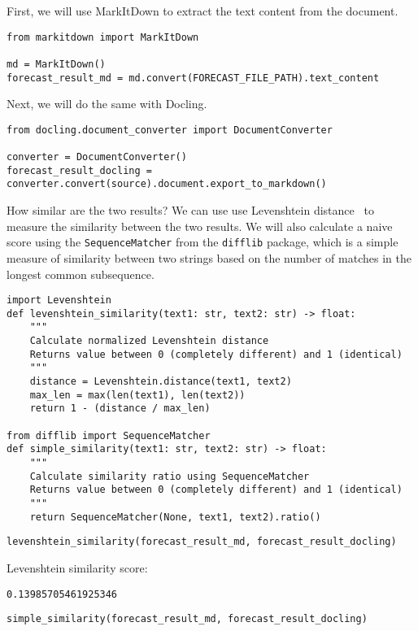 First, we will use MarkItDown to extract the text content from the document.

\begin{verbatim}
from markitdown import MarkItDown

md = MarkItDown()
forecast_result_md = md.convert(FORECAST_FILE_PATH).text_content
\end{verbatim}

Next, we will do the same with Docling.

\begin{verbatim}
from docling.document_converter import DocumentConverter

converter = DocumentConverter()
forecast_result_docling = converter.convert(source).document.export_to_markdown()
\end{verbatim}
How similar are the two results? We can use use Levenshtein distance~ to measure the similarity between the two results. We will also calculate a naive score using the \texttt{SequenceMatcher} from the \texttt{difflib} package, which is a simple measure of similarity between two strings based on the number of matches in the longest common subsequence.

\begin{verbatim}
import Levenshtein
def levenshtein_similarity(text1: str, text2: str) -> float:
    """
    Calculate normalized Levenshtein distance
    Returns value between 0 (completely different) and 1 (identical)
    """
    distance = Levenshtein.distance(text1, text2)
    max_len = max(len(text1), len(text2))
    return 1 - (distance / max_len)

from difflib import SequenceMatcher
def simple_similarity(text1: str, text2: str) -> float:
    """
    Calculate similarity ratio using SequenceMatcher
    Returns value between 0 (completely different) and 1 (identical)
    """
    return SequenceMatcher(None, text1, text2).ratio()
\end{verbatim}

\begin{verbatim}
levenshtein_similarity(forecast_result_md, forecast_result_docling)
\end{verbatim}

Levenshtein similarity score:
\begin{verbatim}
0.13985705461925346
\end{verbatim}


\begin{verbatim}
simple_similarity(forecast_result_md, forecast_result_docling)
\end{verbatim}


